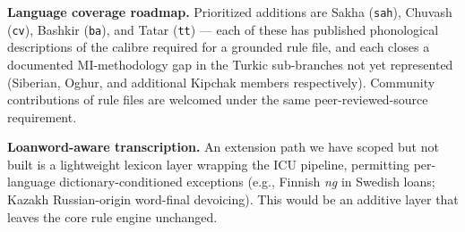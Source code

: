 \textbf{Language coverage roadmap.} Prioritized additions are Sakha (\texttt{sah}), Chuvash (\texttt{cv}), Bashkir (\texttt{ba}), and Tatar (\texttt{tt}) — each of these has published phonological descriptions of the calibre required for a grounded rule file, and each closes a documented MI-methodology gap in the Turkic sub-branches not yet represented (Siberian, Oghur, and additional Kipchak members respectively). Community contributions of rule files are welcomed under the same peer-reviewed-source requirement.

\textbf{Loanword-aware transcription.} An extension path we have scoped but not built is a lightweight lexicon layer wrapping the ICU pipeline, permitting per-language dictionary-conditioned exceptions (e.g., Finnish \emph{ng} in Swedish loans; Kazakh Russian-origin word-final devoicing). This would be an additive layer that leaves the core rule engine unchanged.

